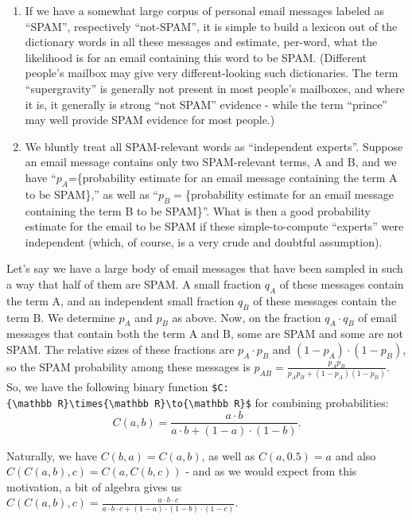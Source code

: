 \documentclass[11pt]{article}
\begin{document}
\begin{enumerate}
\def\labelenumi{\arabic{enumi}.}
\item
  If we have a somewhat large corpus of personal email messages labeled
  as ``SPAM'', respectively ``not-SPAM'', it is simple to build a
  lexicon out of the dictionary words in all these messages and
  estimate, per-word, what the likelihood is for an email containing
  this word to be SPAM. (Different people's mailbox may give very
  different-looking such dictionaries. The term ``supergravity'' is
  generally not present in most people's mailboxes, and where it is, it
  generally is strong ``not SPAM'' evidence - while the term ``prince''
  may well provide SPAM evidence for most people.)
\item
  We bluntly treat all SPAM-relevant words as ``independent experts''.
  Suppose an email message contains only two SPAM-relevant terms, A and
  B, and we have ``\(p_A\)=\{probability estimate for an email message
  containing the term A to be SPAM\},'' as well as
  ``\(p_B=\)\{probability estimate for an email message containing the
  term B to be SPAM\}''. What is then a good probability estimate for
  the email to be SPAM if these simple-to-compute ``experts'' were
  independent (which, of course, is a very crude and doubtful
  assumption).
\end{enumerate}

Let's say we have a large body of email messages that have been sampled
in such a way that half of them are SPAM. A small fraction \(q_A\) of
these messages contain the term A, and an independent small fraction
\(q_B\) of these messages contain the term B. We determine \(p_A\) and
\(p_B\) as above. Now, on the fraction \(q_A\cdot q_B\) of email
messages that contain both the term A and B, some are SPAM and some are
not SPAM. The relative sizes of these fractions are \(p_A\cdot p_B\) and
\((1-p_A)\cdot(1-p_B)\), so the SPAM probability among these messages is
\(p_{AB}=\frac{p_Ap_B}{p_A p_B+(1-p_A)(1-p_B)}\). So, we have the
following binary function
\texttt{\$C:\{\textbackslash{}mathbb\ R\}\textbackslash{}times\{\textbackslash{}mathbb\ R\}\textbackslash{}to\{\textbackslash{}mathbb\ R\}\$}
for combining probabilities: \[
  C(a, b)=\frac{a\cdot b}{a\cdot b + (1-a)\cdot(1-b)}.
\]

Naturally, we have \(C(b, a)=C(a, b)\), as well as \(C(a, 0.5)=a\) and
also \(C(C(a, b), c)=C(a,C(b,c))\) - and as we would expect from this
motivation, a bit of algebra gives us
\(C(C(a, b), c)=\frac{a\cdot b \cdot c}{a\cdot b\cdot c+(1-a)\cdot(1-b)\cdot(1-c)}\).
\end{document}
